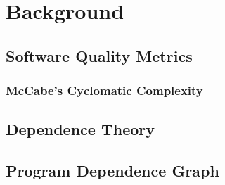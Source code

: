 \chapter{Background}

\section{Software Quality Metrics}

\subsection{McCabe's Cyclomatic Complexity}
\cite{cyclomatic-complexity}

\section{Dependence Theory}
\cite{optimizing-compilers-book}

\section{Program Dependence Graph}

\cite{pdg}
